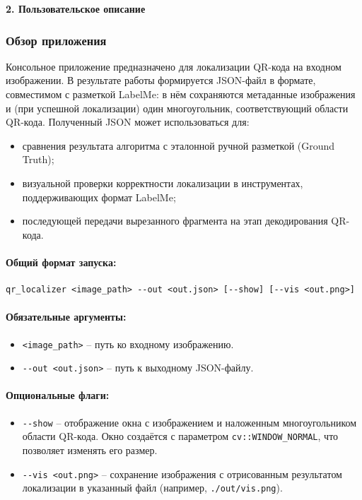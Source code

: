 \newpage
\begin{center}
	\textbf{\large 2. Пользовательское описание}
\end{center}

\subsubsection{Обзор приложения}

Консольное приложение предназначено для локализации QR-кода на входном изображении.
В результате работы формируется JSON-файл в формате, совместимом с разметкой LabelMe: в нём сохраняются метаданные изображения и (при успешной локализации) один многоугольник, соответствующий области QR-кода.
Полученный JSON может использоваться для:
\begin{itemize}
	\item сравнения результата алгоритма с эталонной ручной разметкой (Ground Truth);
	\item визуальной проверки корректности локализации в инструментах, поддерживающих формат LabelMe;
	\item последующей передачи вырезанного фрагмента на этап декодирования QR-кода.
\end{itemize}

\paragraph{Общий формат запуска:}
\begin{verbatim}
qr_localizer <image_path> --out <out.json> [--show] [--vis <out.png>]
\end{verbatim}

\paragraph{Обязательные аргументы:}
\begin{itemize}
	\item \verb|<image_path>| -- путь ко входному изображению.
	\item \verb|--out <out.json>| -- путь к выходному JSON-файлу.
\end{itemize}

\paragraph{Опциональные флаги:}
\begin{itemize}
	\item \verb|--show| -- отображение окна с изображением и наложенным многоугольником области QR-кода.
	      Окно создаётся с параметром \verb|cv::WINDOW_NORMAL|, что позволяет изменять его размер.
	\item \verb|--vis <out.png>| -- сохранение изображения с отрисованным результатом локализации в указанный файл (например, \verb|./out/vis.png|).
\end{itemize}
